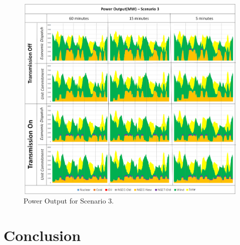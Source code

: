 \documentclass[12pt,LUDisStyle,twosided]{book}
\begin{document}
\begin{figure} 
  \centering
  
	  \includegraphics[width=\textwidth,height=\textheight,keepaspectratio]{PowerOutputScenario3.png}
  
  \caption{Power Output for Scenario 3.}
  \label{fig:powerOutputScenario3}
\end{figure}



\chapter{Conclusion}

\appendix



\nocite{*}


\end{document}
